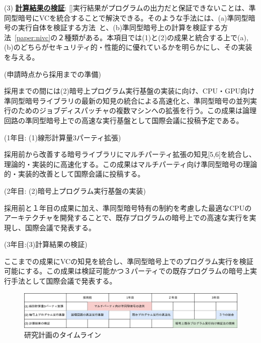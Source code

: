 \noindent(3)  \underline{\textbf{計算結果の検証}}: \ref{}実行結果がプログラムの出力だと保証できないことは、準同型暗号にVCを統合することで解決できる。そのような手法には、(a)準同型暗号の実行自体を検証する方法~\cite{paper:boostVC}と、(b)準同型暗号上の計算を検証する方法~\ref{paper:nivc}の２種類がある。本項目では(1)と(2)の成果と統合する上で(a),(b)のどちらがセキュリティ的・性能的に優れているかを明らかにし、その実装を与える。


\noindent(申請時点から採用までの準備)

採用までの間には(2)暗号上プログラム実行基盤の実装に向け、CPU・GPU向け準同型暗号ライブラリの最新の知見の統合による高速化と、準同型暗号の並列実行のためのジョブディスパッチャの複数マシンへの拡張を行う。この成果は論理回路の準同型暗号上での高速な実行基盤として国際会議に投稿予定である。

\noindent(1年目: (1)線形計算量3パーティ拡張)

採用前から改善する暗号ライブラリにマルチパーティ拡張の知見[5,6]を統合し、理論的・実装的に高速化する。この成果はマルチパーティ向け準同型暗号の理論的・実装的改善として国際会議に投稿する。

\noindent(2年目: (2)暗号上プログラム実行基盤の実装)

採用前と１年目の成果に加え、準同型暗号特有の制約を考慮した最適なCPUのアーキテクチャを開発することで、既存プログラムの暗号上での高速な実行を実現し、国際会議で発表する。

\noindent(3年目:(3)計算結果の検証)

ここまでの成果にVCの知見を統合し、準同型暗号上でのプログラム実行を検証可能にする。この成果は検証可能かつ３パーティでの既存プログラムの暗号上実行手法として国際会議で発表する。

\begin{figure}[h]
    \centering
    \includegraphics[width=\linewidth]{figures/schedule.drawio.png}
    \vspace*{-1cm}
    \caption{研究計画のタイムライン}
    \label{fig:schedule}
\end{figure}


